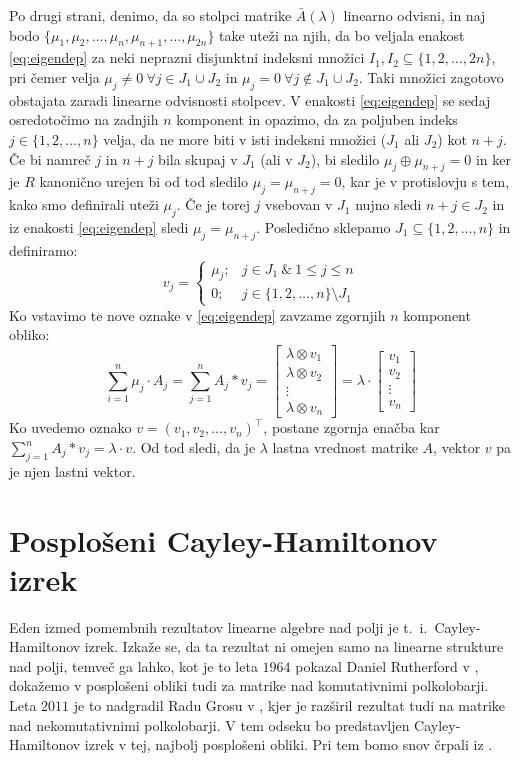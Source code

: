 \documentclass[mat1]{fmfdelo}
\begin{document}
\begin{dokaz}
	Po drugi strani, denimo, da so stolpci matrike $\bar{A}(\lambda)$ linearno odvisni, in naj bodo $\{\mu_1, \mu_2, \ldots, \mu_n, \mu_{n+1}, \ldots, \mu_{2n}\}$ take uteži na njih, da bo veljala enakost \ref{eq:eigendep} za neki neprazni disjunktni indeksni množici $I_1, I_2 \subseteq \{1, 2, \ldots, 2n\}$, pri čemer velja $\mu_j \neq 0~\forall j\in J_1\cup J_2$ in $\mu_j = 0~\forall j \notin J_1\cup J_2$. Taki množici zagotovo obstajata zaradi linearne odvisnosti stolpcev. V enakosti \ref{eq:eigendep} se sedaj osredotočimo na zadnjih $n$ komponent in opazimo, da za poljuben indeks $j \in \{1, 2, \ldots, n\}$ velja, da ne more biti v isti indeksni množici ($J_1$ ali $J_2$) kot $n+j$. Če bi namreč $j$ in $n+j$ bila skupaj v $J_1$ (ali v $J_2$), bi sledilo $\mu_j \oplus \mu_{n+j} = 0$ in ker je $R$ kanonično urejen bi od tod sledilo $\mu_j = \mu_{n+j} = 0$, kar je v protislovju s tem, kako smo definirali uteži $\mu_j$. Če je torej $j$ vsebovan v $J_1$ nujno sledi $n+j \in J_2$ in iz enakosti \ref{eq:eigendep} sledi $\mu_j = \mu_{n+j}$. Posledično sklepamo $J_1 \subseteq \{1, 2, \ldots, n\}$ in definiramo: $$v_j = \begin{cases}
		\mu_j;& j\in J_1~\&~1\leq j \leq n \\ 
		0;& j\in \{1, 2, \ldots, n\}\setminus J_1
	\end{cases}$$
Ko vstavimo te nove oznake v \ref{eq:eigendep} zavzame zgornjih $n$ komponent obliko: $$\sum_{i = 1}^{n}\mu_j\cdot A_j = \sum_{j = 1}^{n} A_j * v_j = \begin{bmatrix}
	\lambda \otimes v_1 \\
	\lambda \otimes v_2 \\
	\vdots \\
	\lambda \otimes v_n
\end{bmatrix} = \lambda \cdot \begin{bmatrix}
v_1 \\
v_2 \\
\vdots \\
v_n
\end{bmatrix}$$
Ko uvedemo oznako $v = (v_1, v_2, \ldots, v_n)^\top$, postane zgornja enačba kar $\sum_{j = 1}^{n} A_j * v_j = \lambda\cdot v$. Od tod sledi, da je $\lambda$ lastna vrednost matrike $A$, vektor $v$ pa je njen lastni vektor.
\end{dokaz}
	

\section{Posplošeni Cayley-Hamiltonov izrek}\label{sect:CHT}
Eden izmed pomembnih rezultatov linearne algebre nad polji je t.~i.~Cayley-Hamiltonov izrek. Izkaže se, da ta rezultat ni omejen samo na linearne strukture nad polji, temveč ga lahko, kot je to leta $1964$ pokazal Daniel Rutherford v \cite{bib:Rutherford}, dokažemo v posplošeni obliki tudi za matrike nad komutativnimi polkolobarji. Leta $2011$ je to nadgradil Radu Grosu v \cite{bib:Grosu}, kjer je razširil rezultat tudi na matrike nad nekomutativnimi polkolobarji. V tem odseku bo predstavljen Cayley-Hamiltonov izrek v tej, najbolj posplošeni obliki. Pri tem bomo snov črpali iz \cite{bib:Grosu}.
\end{document}
